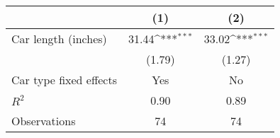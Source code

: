 {
\def\sym#1{\ifmmode^{#1}\else\(^{#1}\)\fi}
\begin{tabular}{l*{2}{c}}
\hline\hline
            &\multicolumn{1}{c}{(1)}         &\multicolumn{1}{c}{(2)}         \\
\hline
Car length (inches)&       31.44\sym{***}&       33.02\sym{***}\\
            &      (1.79)         &      (1.27)         \\
\hline
Car type fixed effects&         Yes         &          No         \\
$R^{2}$     &        0.90         &        0.89         \\
Observations&          74         &          74         \\
\hline\hline
\end{tabular}
}

